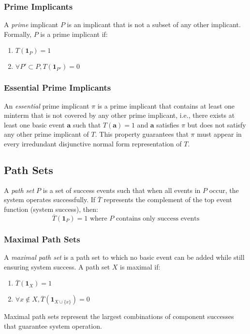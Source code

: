 \subsubsection{Prime Implicants}
A \emph{prime} implicant $P$ is an implicant that is not a subset of any other implicant. Formally, $P$ is a prime implicant if:
\begin{enumerate}
  \item $T(\mathbf{1}_P) = 1$
  \item $\forall P' \subset P, T(\mathbf{1}_{P'}) = 0$
\end{enumerate}

\subsubsection{Essential Prime Implicants}
An \emph{essential} prime implicant $\pi$ is a prime implicant that contains at least one minterm that is not covered by any other prime implicant, i.e., there exists at least one basic event $\mathbf{a}$ such that $T(\mathbf{a}) = 1$ and $\mathbf{a}$ satisfies $\pi$ but does not satisfy any other prime implicant of $T$. This property guarantees that $\pi$ must appear in every irredundant disjunctive normal form representation of $T$.

\subsection{Path Sets}
A \emph{path set} $P$ is a set of success events such that when all events in $P$ occur, the system operates successfully. If $\overline{T}$ represents the complement of the top event function (system success), then:
\[
\overline{T}(\mathbf{1}_P) = 1 \text{ where } P \text{ contains only success events}
\]

\subsubsection{Maximal Path Sets}
A \emph{maximal path set} is a path set to which no basic event can be added while still ensuring system success. A path set $X$ is maximal if:
\begin{enumerate}
  \item $\overline{T}(\mathbf{1}_X) = 1$
  \item $\forall x \notin X, \overline{T}(\mathbf{1}_{X \cup \{x\}}) = 0$
\end{enumerate}
Maximal path sets represent the largest combinations of component successes that guarantee system operation.


